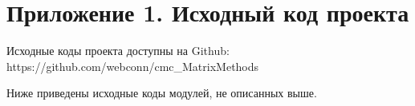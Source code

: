 \documentclass[a4paper,11pt]{report}
\begin{document}
\newpage

\section*{Приложение 1. Исходный код проекта}

Исходные коды проекта доступны на Github: https://github.com/webconn/cmc\_MatrixMethods

Ниже приведены исходные коды модулей, не описанных выше.








\end{document}
